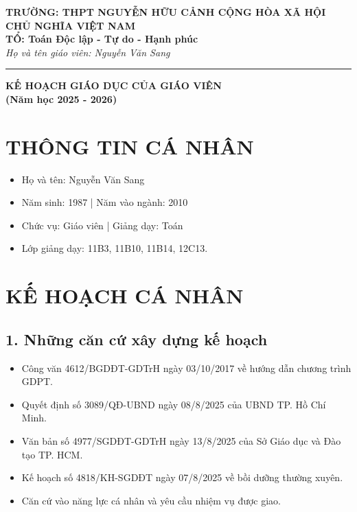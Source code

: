 \documentclass[12pt,a4paper]{article}
\begin{document}
\begin{center}
    \textbf{TRƯỜNG: THPT NGUYỄN HỮU CẢNH \hfill CỘNG HÒA XÃ HỘI CHỦ NGHĨA VIỆT NAM} \\
    \textbf{TỔ: Toán \hfill Độc lập - Tự do - Hạnh phúc} \\
    \textit{Họ và tên giáo viên: Nguyễn Văn Sang} \hfill \rule{4cm}{0.4pt}
\end{center}

\vspace{1cm}

\begin{center}
    \Large \textbf{KẾ HOẠCH GIÁO DỤC CỦA GIÁO VIÊN} \\
    \large \textbf{(Năm học 2025 - 2026)}
\end{center}

\section{THÔNG TIN CÁ NHÂN}
\begin{itemize}
    \item Họ và tên: Nguyễn Văn Sang
    \item Năm sinh: 1987 \quad | \quad Năm vào ngành: 2010
    \item Chức vụ: Giáo viên \quad | \quad Giảng dạy: Toán
    \item Lớp giảng dạy: 11B3, 11B10, 11B14, 12C13.
\end{itemize}

\section{KẾ HOẠCH CÁ NHÂN}
\subsection*{1. Những căn cứ xây dựng kế hoạch}
\begin{itemize}[label=-, noitemsep]
    \item Công văn 4612/BGDĐT-GDTrH ngày 03/10/2017 về hướng dẫn chương trình GDPT.
    \item Quyết định số 3089/QĐ-UBND ngày 08/8/2025 của UBND TP. Hồ Chí Minh.
    \item Văn bản số 4977/SGDĐT-GDTrH ngày 13/8/2025 của Sở Giáo dục và Đào tạo TP. HCM.
    \item Kế hoạch số 4818/KH-SGDĐT ngày 07/8/2025 về bồi dưỡng thường xuyên.
    \item Căn cứ vào năng lực cá nhân và yêu cầu nhiệm vụ được giao.
\end{itemize}
\end{document}
